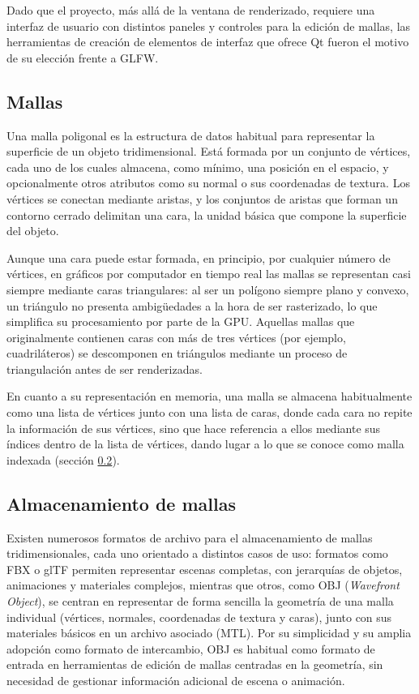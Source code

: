 Dado que el proyecto, más allá de la ventana de renderizado, requiere una interfaz de usuario con distintos paneles y controles para la edición de mallas, las herramientas de creación de elementos de interfaz que ofrece Qt fueron el motivo de su elección frente a GLFW.

\subsection{Mallas}
Una malla poligonal es la estructura de datos habitual para representar la superficie de un objeto tridimensional. Está formada por un conjunto de vértices, cada uno de los cuales almacena, como mínimo, una posición en el espacio, y opcionalmente otros atributos como su normal o sus coordenadas de textura. Los vértices se conectan mediante aristas, y los conjuntos de aristas que forman un contorno cerrado delimitan una cara, la unidad básica que compone la superficie del objeto.

Aunque una cara puede estar formada, en principio, por cualquier número de vértices, en gráficos por computador en tiempo real las mallas se representan casi siempre mediante caras triangulares: al ser un polígono siempre plano y convexo, un triángulo no presenta ambigüedades a la hora de ser rasterizado, lo que simplifica su procesamiento por parte de la GPU. Aquellas mallas que originalmente contienen caras con más de tres vértices (por ejemplo, cuadriláteros) se descomponen en triángulos mediante un proceso de triangulación antes de ser renderizadas.

En cuanto a su representación en memoria, una malla se almacena habitualmente como una lista de vértices junto con una lista de caras, donde cada cara no repite la información de sus vértices, sino que hace referencia a ellos mediante sus índices dentro de la lista de vértices, dando lugar a lo que se conoce como malla indexada (sección \ref{sec:almacenamiento-mallas}).

\subsection{Almacenamiento de mallas} \label{sec:almacenamiento-mallas}

Existen numerosos formatos de archivo para el almacenamiento de mallas tridimensionales, cada uno orientado a distintos casos de uso: formatos como FBX o glTF permiten representar escenas completas, con jerarquías de objetos, animaciones y materiales complejos, mientras que otros, como OBJ (\emph{Wavefront Object}), se centran en representar de forma sencilla la geometría de una malla individual (vértices, normales, coordenadas de textura y caras), junto con sus materiales básicos en un archivo asociado (MTL). Por su simplicidad y su amplia adopción como formato de intercambio, OBJ es habitual como formato de entrada en herramientas de edición de mallas centradas en la geometría, sin necesidad de gestionar información adicional de escena o animación.

